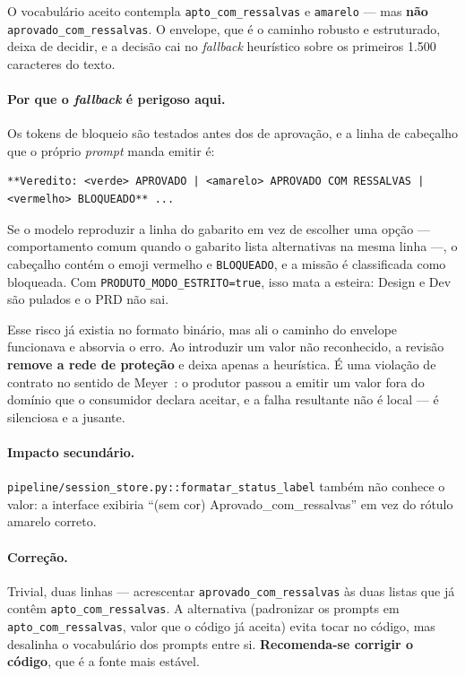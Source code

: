 \documentclass[11pt,a4paper]{article}
\newcommand{\cod}[1]{\texttt{\small #1}}
\begin{document}
O vocabulário aceito contempla \cod{apto\_com\_ressalvas} e \cod{amarelo} --- mas \textbf{não}
\cod{aprovado\_com\_ressalvas}. O envelope, que é o caminho robusto e estruturado, deixa de decidir, e a
decisão cai no \textit{fallback} heurístico sobre os primeiros 1.500 caracteres do texto.

\paragraph{Por que o \textit{fallback} é perigoso aqui.} Os tokens de bloqueio são testados antes dos de
aprovação, e a linha de cabeçalho que o próprio \textit{prompt} manda emitir é:

\begin{lstlisting}
**Veredito: <verde> APROVADO | <amarelo> APROVADO COM RESSALVAS | <vermelho> BLOQUEADO** ...
\end{lstlisting}

Se o modelo reproduzir a linha do gabarito em vez de escolher uma opção --- comportamento comum quando o
gabarito lista alternativas na mesma linha ---, o cabeçalho contém o emoji vermelho e \cod{BLOQUEADO}, e a missão é
classificada como bloqueada. Com \cod{PRODUTO\_MODO\_ESTRITO=true}, isso mata a esteira: Design e Dev são
pulados e o PRD não sai.

Esse risco já existia no formato binário, mas ali o caminho do envelope funcionava e absorvia o erro. Ao
introduzir um valor não reconhecido, a revisão \textbf{remove a rede de proteção} e deixa apenas a heurística.
É uma violação de contrato no sentido de Meyer~\cite{meyer1992}: o produtor passou a emitir um valor fora do
domínio que o consumidor declara aceitar, e a falha resultante não é local --- é silenciosa e a jusante.

\paragraph{Impacto secundário.} \cod{pipeline/session\_store.py::formatar\_status\_label} também não conhece
o valor: a interface exibiria ``(sem cor) Aprovado\_com\_ressalvas'' em vez do rótulo amarelo correto.

\paragraph{Correção.} Trivial, duas linhas --- acrescentar \cod{aprovado\_com\_ressalvas} às duas listas que
já contêm \cod{apto\_com\_ressalvas}. A alternativa (padronizar os prompts em \cod{apto\_com\_ressalvas},
valor que o código já aceita) evita tocar no código, mas desalinha o vocabulário dos prompts entre si.
\textbf{Recomenda-se corrigir o código}, que é a fonte mais estável.
\end{document}

